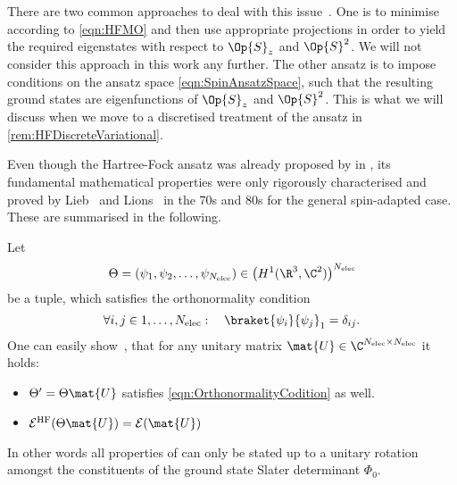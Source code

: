 \begin{rem}
	There are two common approaches to deal with this issue~\cite{McWeeny1985}.
	One is to minimise according to \eqref{eqn:HFMO}
	and then use appropriate projections in order to yield the required
	eigenstates with respect to $\Op{S}_z$ and $\Op{S}^2$.
	We will not consider this approach in this work any further.
	The other ansatz is to impose conditions
	on the ansatz space \eqref{eqn:SpinAnsatzSpace},
	such that the resulting \HF ground states
	are eigenfunctions of $\Op{S}_z$ and $\Op{S}^2$.
	This is what we will discuss when we move to a discretised
	treatment of the \HF ansatz in \vref{rem:HFDiscreteVariational}.
\end{rem}

Even though the Hartree-Fock ansatz was already proposed
by \citet{Fock1930} in \citeyear{Fock1930},
its fundamental mathematical properties were
only rigorously characterised and proved by Lieb~\cite{Lieb1977}
and Lions~\cite{Lions1987,Lions1989} in the 70s and 80s
for the general spin-adapted case.
These are summarised in the following.

\begin{rem}
	\label{rem:HFInvariance}
	Let
	\[ \Theta = \left(\psi_1, \psi_2, \ldots, \psi_{\Nelec}\right)
		\in \left(H^1(\R^3, \C^2)\right)^{\Nelec} \]
	be a tuple, which satisfies the orthonormality condition
	\begin{equation}
		\forall i,j \in 1,\ldots,\Nelec: \quad \braket{\psi_i}{\psi_j}_1 = \delta_{ij}.
		\label{eqn:OrthonormalityCodition}
	\end{equation}
	One can easily show~\cite{Lions1989},
	that for any unitary matrix $\mat{U} \in \C^{\Nelec\times\Nelec}$ it holds:
	\begin{itemize}
		\item $\Theta' = \Theta \mat{U}$ satisfies \eqref{eqn:OrthonormalityCodition} as well.
		\item $\mathcal{E}^\text{HF}(\Theta \mat{U}) = \mathcal{E}(\mat{U})$
	\end{itemize}
	In other words all properties of \HF can only be stated up to
	a unitary rotation amongst the constituents of the ground state Slater
	determinant $\Phi_0$.
\end{rem}

